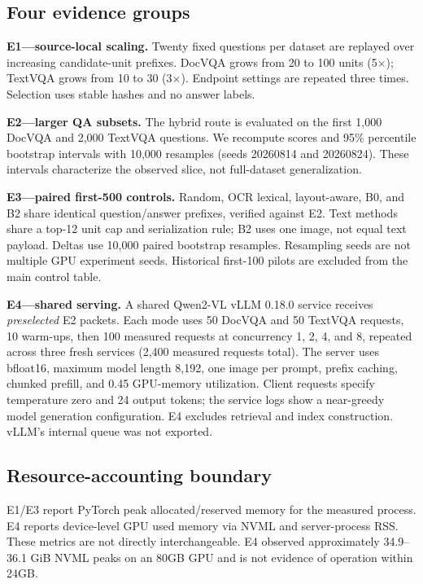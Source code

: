 ﻿\documentclass[conference]{IEEEtran}
\newcommand{\bzero}{\textsc{B0}\xspace}
\newcommand{\btwo}{\textsc{B2}\xspace}
\begin{document}
\subsection{Four evidence groups}
\textbf{E1---source-local scaling.} Twenty fixed questions per dataset are replayed over increasing candidate-unit prefixes. DocVQA grows from 20 to 100 units (5$\times$); TextVQA grows from 10 to 30 (3$\times$). Endpoint settings are repeated three times. Selection uses stable hashes and no answer labels.

\textbf{E2---larger QA subsets.} The hybrid route is evaluated on the first 1,000 DocVQA and 2,000 TextVQA questions. We recompute scores and 95\% percentile bootstrap intervals with 10,000 resamples (seeds 20260814 and 20260824). These intervals characterize the observed slice, not full-dataset generalization.

\textbf{E3---paired first-500 controls.} Random, OCR lexical, layout-aware, \bzero, and \btwo share identical question/answer prefixes, verified against E2. Text methods share a top-12 unit cap and serialization rule; \btwo uses one image, not equal text payload. Deltas use 10,000 paired bootstrap resamples. Resampling seeds are not multiple GPU experiment seeds. Historical first-100 pilots are excluded from the main control table.

\textbf{E4---shared serving.} A shared Qwen2-VL vLLM 0.18.0 service receives \emph{preselected} E2 packets. Each mode uses 50 DocVQA and 50 TextVQA requests, 10 warm-ups, then 100 measured requests at concurrency 1, 2, 4, and 8, repeated across three fresh services (2,400 measured requests total). The server uses bfloat16, maximum model length 8,192, one image per prompt, prefix caching, chunked prefill, and 0.45 GPU-memory utilization. Client requests specify temperature zero and 24 output tokens; the service logs show a near-greedy model generation configuration. E4 excludes retrieval and index construction. vLLM's internal queue was not exported.

\subsection{Resource-accounting boundary}
E1/E3 report PyTorch peak allocated/reserved memory for the measured process. E4 reports device-level GPU used memory via NVML and server-process RSS. These metrics are not directly interchangeable. E4 observed approximately 34.9--36.1 GiB NVML peaks on an 80GB GPU and is not evidence of operation within 24GB.
\end{document}
